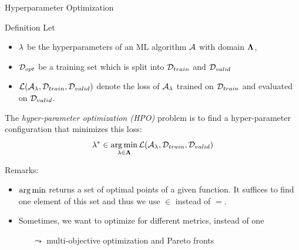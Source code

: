 \begin{frame}[c]{Hyperparameter Optimization}

\begin{block}{Definition}
	Let 
	\begin{itemize}
		\item $\mathbf{\lambda}$ be the hyperparameters of an ML algorithm $\mathcal{A}$ with domain $\mathbf{\Lambda}$,
		\pause
		\item $\mathcal{D}_{opt}$ be a training set which is split into $\mathcal{D}_{train}$ and $\mathcal{D}_{valid}$ 
		\pause
		\item $\mathcal{L}(\mathcal{A}_{\mathbf{\lambda}}, \mathcal{D}_{train}, \mathcal{D}_{valid})$ denote the loss of $\mathcal{A}_{\mathbf{\lambda}}$ trained on $\mathcal{D}_{train}$ and evaluated on $\mathcal{D}_{valid}$.
	\end{itemize}
	\pause
	The \emph{hyper-parameter optimization (HPO)} problem is to find a hyper-parameter configuration that minimizes this loss:
	\begin{equation}
	\mathbf{\lambda}^* \in \operatorname*{arg\,min}_{\mathbf{\lambda} \in \mathbf{\Lambda}} \mathcal{L}(\mathcal{A}_{\mathbf{\lambda}}, \mathcal{D}_{train}, \mathcal{D}_{valid}) \nonumber  
	\end{equation}
\end{block}

\pause
Remarks: 

\begin{itemize}
	\item $\operatorname*{arg\,min}$ returns a set of optimal points of a given function. It suffices to find one element of this set and thus we use $\in$ instead of $=$.
	\pause
	\item Sometimes, we want to optimize for different metrics, instead of one
	\begin{itemize}
		\item[$\leadsto$] multi-objective optimization and Pareto fronts
	\end{itemize}
\end{itemize}

\end{frame}
